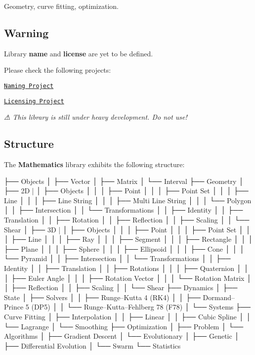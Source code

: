Geometry, curve fitting, optimization.

\href{https://travis-ci.com/open-space-collective/library-mathematics}{\tt } \href{https://codecov.io/gh/open-space-collective/library-mathematics}{\tt } \href{https://open-space-collective.github.io/library-mathematics}{\tt }

\subsection*{Warning}

Library {\bfseries name} and {\bfseries license} are yet to be defined.

Please check the following projects\+:


\begin{DoxyItemize}
\item \href{https://github.com/orgs/open-space-collective/projects/1}{\tt Naming Project}
\item \href{https://github.com/orgs/open-space-collective/projects/2}{\tt Licensing Project}
\end{DoxyItemize}

{\itshape ⚠ This library is still under heavy development. Do not use!}

\subsection*{Structure}

The {\bfseries Mathematics} library exhibits the following structure\+:


\begin{DoxyCode}
├── Objects
│   ├── Vector
│   ├── Matrix
│   └── Interval
├── Geometry
│   ├── 2D
|   │   ├── Objects
│   │   │   ├── Point
│   │   │   ├── Point Set
│   │   │   ├── Line
│   │   │   ├── Line String
│   │   │   ├── Multi Line String
│   │   │   └── Polygon
│   │   ├── Intersection
│   │   └── Transformations
│   │       ├── Identity
│   │       ├── Translation
│   │       ├── Rotation
│   │       ├── Reflection
│   │       ├── Scaling
│   │       └── Shear
│   ├── 3D
|   │   ├── Objects
│   │   │   ├── Point
│   │   │   ├── Point Set
│   │   │   ├── Line
│   │   │   ├── Ray
│   │   │   ├── Segment
│   │   │   ├── Rectangle
│   │   │   ├── Plane
│   │   │   ├── Sphere
│   │   │   ├── Ellipsoid
│   │   │   ├── Cone
│   │   │   └── Pyramid
│   │   ├── Intersection
│   │   └── Transformations
│   │       ├── Identity
│   │       ├── Translation
│   │       ├── Rotations
│   │       │   ├── Quaternion
│   │       │   ├── Euler Angle
│   │       │   ├── Rotation Vector
│   │       │   └── Rotation Matrix
│   │       ├── Reflection
│   │       ├── Scaling
│   │       └── Shear
├── Dynamics
│   ├── State
│   ├── Solvers
│   │   ├── Runge–Kutta 4 (RK4)
│   │   ├── Dormand–Prince 5 (DP5)
│   │   └── Runge–Kutta–Fehlberg 78 (F78)
│   └── Systems
├── Curve Fitting
│   ├── Interpolation
│   │   ├── Linear
│   │   ├── Cubic Spline
│   │   └── Lagrange
│   └── Smoothing
├── Optimization
│   ├── Problem
│   └── Algorithms
│       ├── Gradient Descent
│       └── Evolutionary
│           ├── Genetic
│           ├── Differential Evolution
│           └── Swarm
└── Statistics
\end{DoxyCode}


